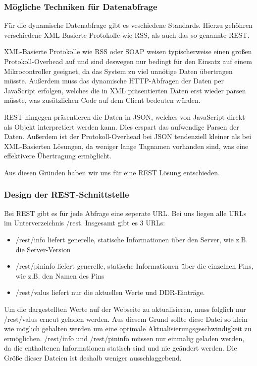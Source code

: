 \subsubsection{Mögliche Techniken für Datenabfrage}

Für die dynamische Datenabfrage gibt es veschiedene Standards. Hierzu gehöhren
verschiedene \ac{XML}-Basierte Protokolle wie RSS, als auch das so genannte
\ac{REST}.

\ac{XML}-Basierte Protokolle wie \ac{RSS} oder \ac{SOAP} weisen typischerweise
einen großen Protokoll-Overhead auf und sind deswegen nur bedingt für den Einsatz auf einem
Mikrocontroller geeignet, da das System zu viel unnötige Daten übertragen
müsste. Außerdem muss das dynamische \ac{HTTP}-Abfragen der Daten per JavaScript
erfolgen, welches die in \ac{XML} präsentierten Daten erst wieder parsen müsste, was
zusätzlichen Code auf dem Client bedeuten würden.

\ac{REST} hingegen präsentieren die Daten in \ac{JSON}, welches von
JavaScript direkt als Objekt interpretiert werden kann. Dies erspart das
aufwendige Parsen der Daten. Außerdem ist der Protokoll-Overhead bei \ac{JSON}
tendenziell kleiner als bei \ac{XML}-Basierten Lösungen, da weniger lange Tagnamen
vorhanden sind, was eine effektivere Übertragung ermöglicht.

Aus diesen Gründen haben wir uns für eine \ac{REST} Lösung entschieden.

\subsubsection{Design der REST-Schnittstelle}
Bei \ac{REST} gibt es für jede Abfrage eine seperate \ac{URL}. Bei uns liegen
alle URLs im Unterverzeichnis \textrm{/rest}. Insgesamt gibt es 3 URLs:
\begin{itemize}
  \item  \textrm{/rest/info} liefert generelle, statische Informationen über den
  Server, wie z.B. die Server-Version
  \item  \textrm{/rest/pininfo} liefert generelle, statische Informationen über
  die einzelnen Pins, wie z.B. den Namen des Pins
  \item  \textrm{/rest/valus} liefert nur die aktuellen Werte und
  \ac{DDR}-Einträge.
\end{itemize}

Um die dargestellten Werte auf der Webseite zu aktualisieren, muss folglich nur
\textrm{/rest/valus} erneut geladen werden. Aus diesem Grund sollte diese
Datei so klein wie möglich gehalten werden um eine optimale
Aktualisierungsgeschwindigkeit zu ermöglichen. \textrm{/rest/info} und  
\textrm{/rest/pininfo} müssen nur einmalig geladen werden, da die enthaltenen
Informationen statisch sind und nie geändert werden. Die Größe dieser Dateien
ist deshalb weniger ausschlaggebend.
